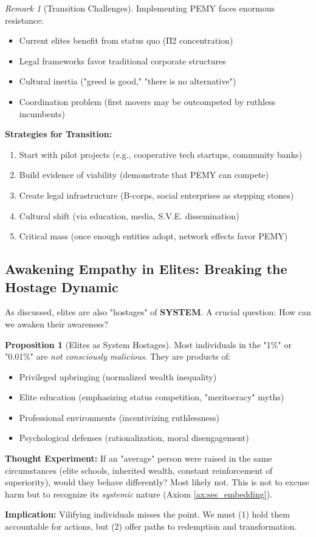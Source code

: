 \documentclass[11pt,a4paper]{article}
\newcommand{\SYSTEM}{\textbf{SYSTEM}}
\theoremstyle{definition}
\newtheorem{proposition}{Proposition}[section]
\theoremstyle{remark}
\newtheorem{remark}{Remark}[section]
\begin{document}
\begin{remark}[Transition Challenges]
Implementing PEMY faces enormous resistance:
\begin{itemize}
\item Current elites benefit from status quo (П2 concentration)
\item Legal frameworks favor traditional corporate structures
\item Cultural inertia ("greed is good," "there is no alternative")
\item Coordination problem (first movers may be outcompeted by ruthless incumbents)
\end{itemize}

\textbf{Strategies for Transition:}
\begin{enumerate}
\item Start with pilot projects (e.g., cooperative tech startups, community banks)
\item Build evidence of viability (demonstrate that PEMY can compete)
\item Create legal infrastructure (B-corps, social enterprises as stepping stones)
\item Cultural shift (via education, media, S.V.E. dissemination)
\item Critical mass (once enough entities adopt, network effects favor PEMY)
\end{enumerate}
\end{remark}

\subsection{Awakening Empathy in Elites: Breaking the Hostage Dynamic}

As discussed, elites are also "hostages" of \SYSTEM{}. A crucial question: How can we awaken their awareness?

\begin{proposition}[Elites as System Hostages]
\label{prop:elites_hostage}
Most individuals in the "1\%" or "0.01\%" are \textit{not consciously malicious}. They are products of:
\begin{itemize}
\item Privileged upbringing (normalized wealth inequality)
\item Elite education (emphasizing status competition, "meritocracy" myths)
\item Professional environments (incentivizing ruthlessness)
\item Psychological defenses (rationalization, moral disengagement)
\end{itemize}

\textbf{Thought Experiment:} If an "average" person were raised in the same circumstances (elite schools, inherited wealth, constant reinforcement of superiority), would they behave differently? Most likely not. This is not to excuse harm but to recognize its \textit{systemic} nature (Axiom \ref{ax:ses_embedding}).

\textbf{Implication:} Vilifying individuals misses the point. We must (1) hold them accountable for actions, but (2) offer paths to redemption and transformation.
\end{proposition}
\end{document}
